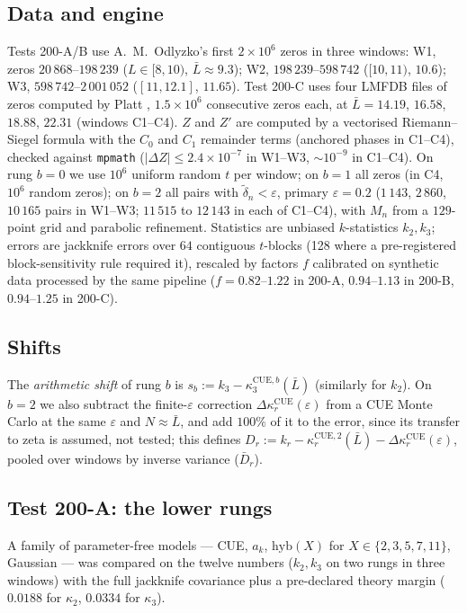 \documentclass[12pt]{amsart}
\theoremstyle{remark}
\newcommand{\eps}{\varepsilon}
\newcommand{\1}{\mathbf{1}}
\begin{document}
\subsection*{Data and engine}
Tests 200-A/B use A.~M.~Odlyzko's first $2\times10^6$ zeros
\cite{OdlyzkoTables,Odl87} in three windows: W1, zeros
$20\,868$--$198\,239$ ($L\in[8,10)$, $\bar L\approx9.3$); W2,
$198\,239$--$598\,742$ ($[10,11)$, $10.6$); W3,
$598\,742$--$2\,001\,052$ ($[11,12.1]$, $11.65$). Test 200-C uses four
LMFDB files of zeros computed by Platt \cite{LMFDB,Pla15}, $1.5\times10^6$
consecutive zeros each, at $\bar L=14.19$, $16.58$, $18.88$, $22.31$
(windows C1--C4). $Z$ and $Z'$ are computed by a vectorised
Riemann--Siegel formula with the $C_0$ and $C_1$ remainder terms (anchored
phases in C1--C4), checked against \texttt{mpmath} ($|\Delta Z|\le
2.4\times10^{-7}$ in W1--W3, $\sim10^{-9}$ in C1--C4). On rung $b=0$ we use
$10^6$ uniform random $t$ per window; on $b=1$ all zeros (in C4, $10^6$
random zeros); on $b=2$ all pairs with $\tilde\delta_n<\eps$, primary
$\eps=0.2$ ($1\,143$, $2\,860$, $10\,165$ pairs in W1--W3; $11\,515$ to
$12\,143$ in each of C1--C4), with $M_n$ from a $129$-point grid and
parabolic refinement. Statistics are unbiased $k$-statistics $k_2,k_3$;
errors are jackknife errors over $64$ contiguous $t$-blocks (128 where a
pre-registered block-sensitivity rule required it), rescaled by factors
$f$ calibrated on synthetic data processed by the same pipeline
($f=0.82$--$1.22$ in 200-A, $0.94$--$1.13$ in 200-B, $0.94$--$1.25$ in
200-C).

\subsection*{Shifts}
The \emph{arithmetic shift} of rung $b$ is
$s_b:=k_3-\kappa_3^{\mathrm{CUE},b}(\bar L)$ (similarly for $k_2$). On
$b=2$ we also subtract the finite-$\eps$ correction
$\Delta\kappa_r^{\mathrm{CUE}}(\eps)$ from a CUE Monte Carlo at the same
$\eps$ and $N\approx\bar L$, and add $100\%$ of it to the error, since its
transfer to zeta is assumed, not tested; this defines
$D_r:=k_r-\kappa_r^{\mathrm{CUE},2}(\bar L)-\Delta\kappa_r^{\mathrm{CUE}}(\eps)$,
pooled over windows by inverse variance ($\bar D_r$).

\subsection*{Test 200-A: the lower rungs}
A family of parameter-free models --- CUE, $a_k$, $\mathrm{hyb}(X)$ for
$X\in\{2,3,5,7,11\}$, Gaussian --- was compared on the twelve numbers
($k_2,k_3$ on two rungs in three windows) with the full jackknife
covariance plus a pre-declared theory margin ($0.0188$ for $\kappa_2$,
$0.0334$ for $\kappa_3$).
\end{document}

